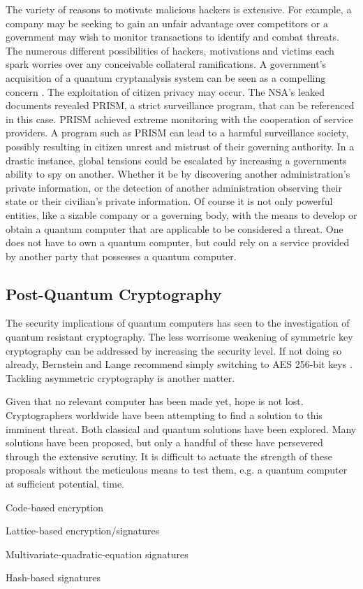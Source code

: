 The variety of reasons to motivate malicious hackers is extensive. For example, a company may be seeking to gain an unfair advantage over competitors or a government may wish to monitor transactions to identify and combat threats. The numerous different possibilities of hackers, motivations and victims each spark worries over any conceivable collateral ramifications. A government's acquisition of a quantum cryptanalysis system can be seen as a compelling concern \cite{Sec_Risk}. The exploitation of citizen privacy may occur. The NSA's leaked documents revealed PRISM, a strict surveillance program, that can be referenced in this case. PRISM achieved extreme monitoring with the cooperation of service providers. A program such as PRISM can lead to a harmful surveillance society, possibly resulting in citizen unrest and mistrust of their governing authority. In a drastic instance, global tensions could be escalated by increasing a governments ability to spy on another. Whether it be by discovering another administration's private information, or the detection of another administration observing their state or their civilian's private information. 
Of course it is not only powerful entities, like a sizable company or a governing body, with the means to develop or obtain a quantum computer that are applicable to be considered a threat. One does not have to own a quantum computer, but could rely on a service provided by another party that possesses a quantum computer. 

\subsection{Post-Quantum Cryptography}
The security implications of quantum computers has seen to the investigation of quantum resistant cryptography. The less worrisome weakening of symmetric key cryptography can be addressed by increasing the security level. If not doing so already, Bernstein and Lange recommend simply switching to AES 256-bit keys \cite{Post_Q_Cryptog}. 
Tackling asymmetric cryptography is another matter.

Given that no relevant computer has been made yet, hope is not lost. 
Cryptographers worldwide have been attempting to find a solution to this imminent threat. 
Both classical and quantum solutions have been explored. Many solutions have been proposed, but only a handful of these have persevered through the extensive scrutiny.
It is difficult to actuate the strength of these proposals without the meticulous means to test them, e.g. a quantum computer at sufficient potential, time. 

Code-based encryption 

Lattice-based encryption/signatures

Multivariate-quadratic-equation signatures

Hash-based signatures

